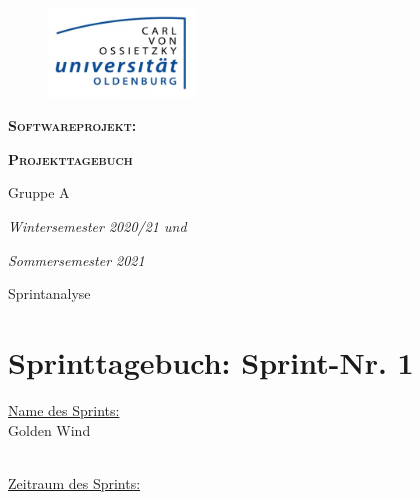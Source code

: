 \documentclass[12pt,a4paper, oneside]{article}
\author{Uni Oldenburg, SWP2020 Gruppe A}
\begin{document}
    \begin{titlepage}
        \pagestyle{empty}
        \begin{center}

            \begin{figure}[h]
                \centering
                \includegraphics[width=0.35\textwidth]{img/Logo.jpg}
            \end{figure}

            \bigskip \bigskip \noindent
            \textsc{\textbf{\LARGE Softwareprojekt:}} \par \bigskip \noindent
            \textsc{\textbf{\LARGE Projekttagebuch}}


            \par \bigskip \bigskip \bigskip \bigskip \bigskip \noindent
            {\Large Gruppe A} \par \medskip \noindent

            \par \bigskip \bigskip \bigskip \bigskip \bigskip \bigskip \noindent
            \textit{\Large Wintersemester 2020/21 und} \par \noindent
            \textit{\Large Sommersemester 2021}

            \par \bigskip \bigskip \bigskip \bigskip \bigskip \bigskip \noindent
            \par \bigskip \bigskip \bigskip \noindent
            {\Large Sprintanalyse} \par \medskip \noindent

        \end{center}
    \end{titlepage}

    \tableofcontents
    \pagebreak


    \section{Sprinttagebuch: Sprint-Nr. 1}
    \underline{Name des Sprints:}
    \\
    Golden Wind

    \noindent
    \\
    \underline{Zeitraum des Sprints:}
\end{document}

